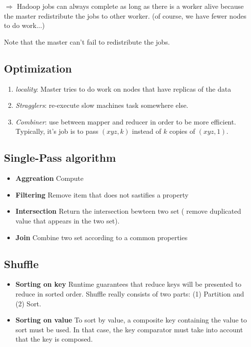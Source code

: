 $\Rightarrow$ Hadoop jobs can always complete as long as there is a
worker alive because the master redistribute the jobs to other worker.
(of course, we have fewer nodes to do work...)

Note that the master can't fail to redistribute the jobs.

\subsection{Optimization}

\begin{enumerate}
    \item \textit{locality}: Master tries to do work on nodes that 
        have replicas of the data
    \item \textit{Stragglers}: re-execute slow machines task somewhere else.

    \item \textit{Combiner}: use between mapper and reducer in order to be more efficient.
        Typically, it's job is to pass $(xyz, k)$ instead of $k$ copies of $(xyz, 1)$.
\end{enumerate}

\subsection{Single-Pass algorithm}

\begin{itemize}
	\item \textbf{Aggreation} Compute 
	\item \textbf{Filtering} Remove item that does not sastifies a property
	\item \textbf{Intersection} Return the intersection bewteen two set (
	remove duplicated value that appears in the two set).
	\item \textbf{Join} Combine two set according to a common properties
\end{itemize}

\subsection{Shuffle}

\begin{itemize}
    \item \textbf{Sorting on key}
        Runtime guarantees that reduce keys will be 
        presented to reduce in sorted order. Shuffle really
        consists of two parts: (1) Partition and (2) Sort.

    \item \textbf{Sorting on value} To sort by value, a composite key containing 
    the value to sort must be used. In that case, the key comparator must take
    into account that the key is composed. 
\end{itemize}

